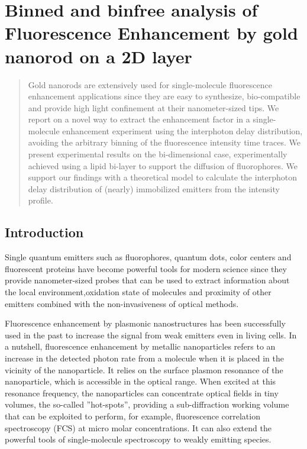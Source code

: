 \chapter{Binned and binfree analysis of Fluorescence Enhancement by gold nanorod on a 2D layer}
\label{chapter:binfree}
\graphicspath{{./chapters/c3_binfree/figures/}}


\begin{abstract}
Gold nanorods are extensively used for single-molecule fluorescence enhancement applications since they are easy to synthesize, bio-compatible and provide high light confinement at their nanometer-sized tips. We report on a novel way to extract the enhancement factor in a single-molecule enhancement experiment using the interphoton delay distribution, avoiding the arbitrary binning of the fluorescence intensity time traces. We present experimental results on the bi-dimensional case, experimentally achieved using a lipid bi-layer to support the diffusion of fluorophores.  We support our findings with a theoretical model to calculate the interphoton delay distribution of (nearly) immobilized emitters from the intensity profile.
\end{abstract}

\section{Introduction}
Single quantum emitters such as fluorophores, quantum dots, color centers 
and fluorescent proteins have become powerful tools for modern science 
since they provide nanometer-sized probes that can be used to extract 
information about the local environment\cite{moerner1999illuminating, kulzer2010single},oxidation state of molecules\cite{zhang2017gold} and proximity of other emitters\cite{stein2011single} combined with the non-invasiveness of optical methods.

 Fluorescence enhancement by plasmonic nanostructures has been successfully 
used in the past to increase the signal from weak 
emitters\cite{kinkhabwala2009large,yuan2013thousandfold,khatua2014resonant} even in 
living cells\cite{vanzanten2010imaging}. In a nutshell, fluorescence enhancement
by metallic nanoparticles refers to an increase in the detected 
photon rate from a molecule when it is placed in the vicinity of the nanoparticle.
It relies on the surface plasmon resonance of the nanoparticle, which is accessible
in the optical range. When excited at this resonance frequency, 
the nanoparticles can concentrate optical fields in tiny volumes,
the so-called ''hot-spots'', providing a sub-diffraction 
working volume that can be exploited to perform, for example, 
fluorescence correlation spectroscopy (FCS) at micro molar 
concentrations\cite{estrada200810000,manzo2011nanoscale,punj2013gold,khatua2014enhancedfluorescence}.
It can also extend the powerful tools of single-molecule spectroscopy to 
weakly emitting species.


